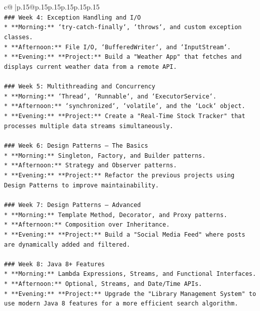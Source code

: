 \documentclass{article}
\begin{document}
{\begin{supertabular}{c@{$\;$}|p{.15\linewidth}@{}p{.15\linewidth}p{.15\linewidth}p{.15\linewidth}p{.15\linewidth}p{.15\linewidth}}
{{{\\ 
\texttt{\#\#\# Week 4: Exception Handling and I/O} \\
\texttt{*   **Morning:** `try{-}catch{-}finally`, `throws`, and custom exception classes.} \\
\texttt{*   **Afternoon:** File I/O, `BufferedWriter`, and `InputStream`.} \\
\texttt{*   **Evening:** **Project:** Build a "Weather App" that fetches and displays current weather data from a remote API.} \\
\\ 
\texttt{\#\#\# Week 5: Multithreading and Concurrency} \\
\texttt{*   **Morning:** `Thread`, `Runnable`, and `ExecutorService`.} \\
\texttt{*   **Afternoon:** `synchronized`, `volatile`, and the `Lock` object.} \\
\texttt{*   **Evening:** **Project:** Create a "Real{-}Time Stock Tracker" that processes multiple data streams simultaneously.} \\
\\ 
\texttt{\#\#\# Week 6: Design Patterns – The Basics} \\
\texttt{*   **Morning:** Singleton, Factory, and Builder patterns.} \\
\texttt{*   **Afternoon:** Strategy and Observer patterns.} \\
\texttt{*   **Evening:** **Project:** Refactor the previous projects using Design Patterns to improve maintainability.} \\
\\ 
\texttt{\#\#\# Week 7: Design Patterns – Advanced} \\
\texttt{*   **Morning:** Template Method, Decorator, and Proxy patterns.} \\
\texttt{*   **Afternoon:** Composition over Inheritance.} \\
\texttt{*   **Evening:** **Project:** Build a "Social Media Feed" where posts are dynamically added and filtered.} \\
\\ 
\texttt{\#\#\# Week 8: Java 8+ Features} \\
\texttt{*   **Morning:** Lambda Expressions, Streams, and Functional Interfaces.} \\
\texttt{*   **Afternoon:** Optional, Streams, and Date/Time APIs.} \\
\texttt{*   **Evening:** **Project:** Upgrade the "Library Management System" to use modern Java 8 features for a more efficient search algorithm.} \\
}}}
\end{supertabular}}
\end{document}
